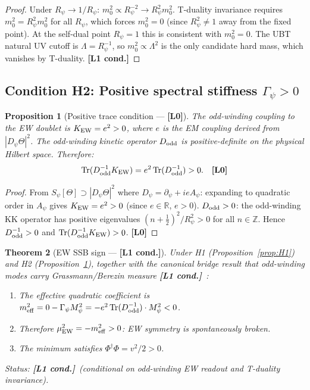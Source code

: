 \documentclass[12pt,a4paper]{article}
\newtheorem{theorem}{Theorem}[section]
\newtheorem{proposition}[theorem]{Proposition}
\theoremstyle{definition}\newtheorem{definition}[theorem]{Definition}
\theoremstyle{remark}\newtheorem{remark}[theorem]{Remark}
\newcommand{\Lz}{\textbf{[L0]}}
\newcommand{\Lc}{\textbf{[L1 cond.]}}
\begin{document}
\begin{proof}
Under $R_\psi\to 1/R_\psi$: $m^2_0\propto R_\psi^{-2}\to R_\psi^2 m^2_0$.
T-duality invariance requires $m^2_0 = R_\psi^2 m^2_0$ for all $R_\psi$,
which forces $m^2_0=0$ (since $R_\psi^2\neq 1$ away from the fixed point).
At the self-dual point $R_\psi=1$ this is consistent with $m^2_0=0$.
The UBT natural UV cutoff is $\Lambda=R_\psi^{-1}$, so $m^2_0\propto\Lambda^2$
is the only candidate hard mass, which vanishes by T-duality. \Lc
\end{proof}

\subsection{Condition H2: Positive spectral stiffness $\Gamma_\psi>0$}

\begin{proposition}[Positive trace condition --- \Lz]
\label{prop:H2}
The odd-winding coupling to the EW doublet is $K_{\rm EW} = e^2>0$,
where $e$ is the EM coupling derived from $|D_\psi\Theta|^2$.
The odd-winding kinetic operator $D_{\rm odd}$ is positive-definite
on the physical Hilbert space. Therefore:
\[
  \mathrm{Tr}(D_{\rm odd}^{-1}K_{\rm EW})
  = e^2\,\mathrm{Tr}(D_{\rm odd}^{-1}) > 0. \quad \Lz
\]
\end{proposition}

\begin{proof}
From $S_\psi[\Theta]\supset|D_\psi\Theta|^2$ where
$D_\psi=\partial_\psi+ieA_\psi$: expanding to quadratic order in $A_\psi$
gives $K_{\rm EW}=e^2>0$ (since $e\in\mathbb{R}$, $e>0$).
$D_{\rm odd}>0$: the odd-winding KK operator has positive eigenvalues
$(n+\tfrac12)^2/R_\psi^2>0$ for all $n\in\mathbb{Z}$.
Hence $D_{\rm odd}^{-1}>0$ and $\mathrm{Tr}(D_{\rm odd}^{-1}K_{\rm EW})>0$.
\Lz
\end{proof}

\begin{theorem}[EW SSB sign --- \Lc]
\label{thm:ssb}
Under H1 (Proposition~\ref{prop:H1}) and H2 (Proposition~\ref{prop:H2}),
together with the canonical bridge result that odd-winding modes carry
Grassmann/Berezin measure \Lc\ \cite{fermionic_bridge}:
\begin{enumerate}
\item The effective quadratic coefficient is
  $m^2_{\rm eff} = 0 - \Gamma_\psi M_\psi^2 = -e^2\,\mathrm{Tr}(D_{\rm odd}^{-1})
  \cdot M_\psi^2 < 0$.
\item Therefore $\mu^2_{\rm EW} = -m^2_{\rm eff} > 0$: EW symmetry is
  spontaneously broken.
\item The minimum satisfies $\Phi^\dagger\Phi = v^2/2 > 0$.
\end{enumerate}
Status: \Lc\ (conditional on odd-winding EW readout and T-duality invariance).
\end{theorem}
\end{document}
